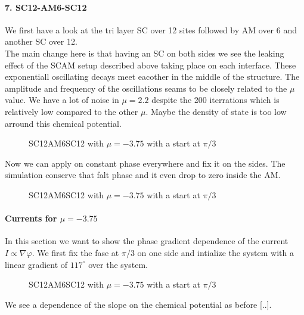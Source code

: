 \documentclass[../main.tex]{subfiles}
\begin{document}
\paragraph{7. SC12-AM6-SC12}$~$\\
We first have a look at the tri layer SC over 12 sites followed by AM over 6 and another SC over 12.\\
The main change here is that having an SC on both sides we see the leaking effect of the SCAM setup described above taking place on each interface.
These exponentiall oscillating decays meet eacother in the middle of the structure. The amplitude and frequency of the oscillations seams to be
closely related to the $\mu$ value. We have a lot of noise in $\mu=2.2$ despite the 200 iterrations which is relatively low compared to the other 
$\mu$. Maybe the density of state is too low
arround this chemical potential.\\ 
\begin{figure}[H]
    \centering
    
    \caption{SC12AM6SC12 with $\mu=-3.75$ with a start at $\pi/3$}
    \label{fig:SC12AM6SC12}
\end{figure} 

Now we can apply on constant phase everywhere and fix it on the sides. The simulation conserve that falt phase and it even drop to zero inside the AM.
\begin{figure}[H]
    \centering
    
    \caption{SC12AM6SC12 with $\mu=-3.75$ with a start at $\pi/3$}
\end{figure}

\paragraph{Currents for $\mu=-3.75$}
In this section we want to show the phase gradient dependence of the current $ I \propto \nabla \varphi$. We first fix the fase at $\pi/3$ on one side
and intialize the system with a linear gradient of $117^{\circ}$ over the system.
\begin{figure}[H]
    \centering
    
    \caption{SC12AM6SC12 with $\mu=-3.75$ with a start at $\pi/3$}
    
\end{figure}
We see a dependence of the slope on the chemical potential as before [..]. \\
\end{document}
